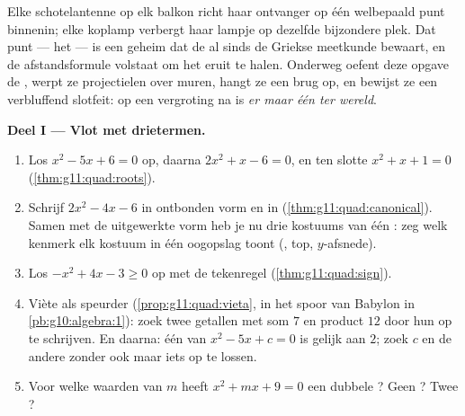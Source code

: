\begin{problem}
\label{pb:g11:quad:1}
Elke schotelantenne op elk balkon richt haar ontvanger op één welbepaald
punt binnenin; elke koplamp verbergt haar lampje op dezelfde bijzondere
plek. Dat punt --- het \emph{} --- is een geheim dat de  al
sinds de Griekse meetkunde bewaart, en de afstandsformule volstaat om het
eruit te halen. Onderweg oefent deze opgave de , werpt ze
projectielen over muren, hangt ze een brug op, en bewijst ze een verbluffend
slotfeit: op een vergroting na is \emph{er maar één  ter wereld}.

\medskip
\noindent\textbf{Deel I --- Vlot met drietermen.}
\begin{enumerate}
  \item Los $x^2 - 5x + 6 = 0$ op, daarna $2x^2 + x - 6 = 0$, en ten slotte
        $x^2 + x + 1 = 0$ (\cref{thm:g11:quad:roots}).
  \item Schrijf $2x^2 - 4x - 6$ in ontbonden vorm en in 
        (\cref{thm:g11:quad:canonical}). Samen met de uitgewerkte vorm heb je
        nu drie kostuums van één : zeg welk kenmerk elk kostuum in één
        oogopslag toont (, top, $y$-afsnede).
  \item Los $-x^2 + 4x - 3 \geq 0$ op met de tekenregel
        (\cref{thm:g11:quad:sign}).
  \item Viète als speurder (\cref{prop:g11:quad:vieta}, in het spoor van
        Babylon in \cref{pb:g10:algebra:1}): zoek twee getallen met som $7$
        en product $12$ door hun  op te schrijven. En daarna: één
         van $x^2 - 5x + c = 0$ is gelijk aan $2$; zoek $c$ en de
        andere  zonder ook maar iets op te lossen.
  \item Voor welke waarden van $m$ heeft $x^2 + mx + 9 = 0$ een dubbele
        ? Geen ? Twee ?
\end{enumerate}


\end{problem}
